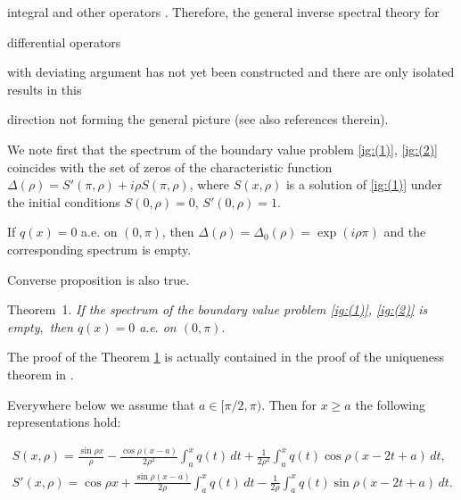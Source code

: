 integral and other operators \cite{ign:5, ign:6, ign:7}. Therefore, the general inverse spectral theory for

differential operators

with deviating argument has not yet been constructed and there are only isolated results in this

direction not forming the general picture \cite{ign:8, ign:9, ign:10, ign:11} (see also references therein).



\smallskip




We note first that the spectrum of the boundary value problem \eqref{ig:(1)}, \eqref{ig:(2)} coincides with the set of zeros of the characteristic function  $\Delta(\rho)=S'(\pi,\rho)+i\rho S(\pi,\rho)$, where $S(x,\rho)$ is a solution of \eqref{ig:(1)} under the initial conditions $S(0,\rho)=0$, $S'(0,\rho)=1$. 

If $q(x)=0$ a.e. on $(0,\pi)$, then $\Delta(\rho)=\Delta_0(\rho)=\exp(i\rho \pi)$ and the corresponding spectrum is empty. 

Converse proposition is also true.



\smallskip



\hypertarget{ign:th1}{}



{\small \sc Theorem~1.} {\it If the spectrum of the boundary value problem {\rm \eqref{ig:(1)}, \eqref{ig:(2)}} is empty$,$ then $q(x)=0$ a$.$e$.$ on $(0,\pi).$}



\smallskip



The proof of the Theorem \hyperlink{ign:th1}{1} is actually contained in the proof of the uniqueness theorem in \cite{ign:5}.





\smallskip



Everywhere below we assume that $a\in[\pi/2,\pi)$. Then for $x\ge a$ the following representations hold:

\begin{gather}

S(x,\rho)=\frac{\sin\rho x}{\rho}-\frac{\cos\rho(x-a)}{2\rho^2}

\int_a^x q(t)\,dt+\frac{1}{2\rho^2}\int_a^x q(t)\cos\rho(x-2t+a)\,dt,

\\

S'(x,\rho)=\cos\rho x+\frac{\sin\rho(x-a)}{2\rho} \int_a^x q(t)\,dt

- \frac{1}{2\rho}\int_a^x q(t)\sin\rho(x-2t+a)\,dt.

\end{gather}

